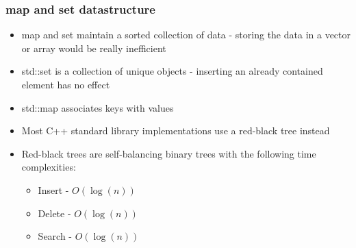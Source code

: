 \documentclass{beamer}
\begin{document}
\begin{frame}
  \frametitle{map and set datastructure}
  \begin{itemize}
  \item map and set maintain a sorted collection of data
    - storing the data in a vector or array would be really inefficient
  \item std::set is a collection of unique objects - inserting an already contained element has no effect
  \item std::map associates keys with values
  \item Most C++ standard library implementations use a red-black tree instead
  \item Red-black trees are self-balancing binary trees with the following time complexities:
    \begin{itemize}
    \item Insert - $O(\log(n))$
    \item Delete - $O(\log(n))$
    \item Search - $O(\log(n))$
    \end{itemize}
  \end{itemize}
\end{frame}
\end{document}
